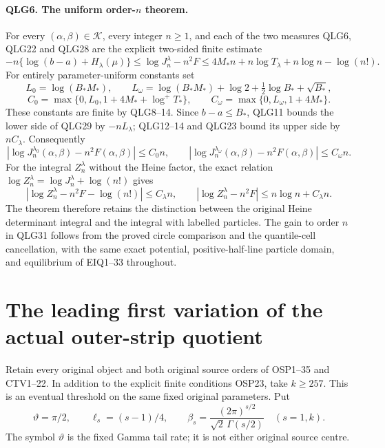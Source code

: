 \documentclass[11pt,a4paper]{article}
\begin{document}
\paragraph{QLG6. The uniform order-\(n\) theorem.}
For every \((\alpha,\beta)\in\mathcal K\), every integer \(n\geq1\),
and each of the two measures QLG6, QLG22 and QLG28 are the explicit
two-sided finite estimate
\[
 \boxed{
 -n\{\log(b-a)+H_\lambda(\mu)\}
 \leq\log J_n^\lambda-n^2F
 \leq 4M_*n+n\log T_\lambda+n\log n-\log(n!).}
 \tag{QLG29}
\]
For entirely parameter-uniform constants set
\[
 L_0=\log(B_*M_*),\qquad
 L_\omega=\log(B_*M_*)+\log2+\tfrac12\log B_*+\sqrt{B_*},
\]
\[
 C_0=\max\{0,L_0,1+4M_*+\log^+T_*\},\qquad
 C_\omega=\max\{0,L_\omega,1+4M_*\}.
 \tag{QLG30}
\]
These constants are finite by QLG8--14. Since \(b-a\leq B_*\),
QLG11 bounds the lower side of QLG29 by \(-nL_\lambda\); QLG12--14
and QLG23 bound its upper side by \(nC_\lambda\). Consequently
\[
 \boxed{\left|\log J_n^{\lambda_0}(\alpha,\beta)
                 -n^2F(\alpha,\beta)\right|\leq C_0n,
 \qquad
 \left|\log J_n^{\lambda_\omega}(\alpha,\beta)
                 -n^2F(\alpha,\beta)\right|\leq C_\omega n.}
 \tag{QLG31}
\]
For the integral \(Z_n^\lambda\) without the Heine factor, the exact
relation \(\log Z_n^\lambda=\log J_n^\lambda+\log(n!)\) gives
\[
 \left|\log Z_n^\lambda-n^2F-\log(n!)\right|\leq C_\lambda n,
 \qquad
 \left|\log Z_n^\lambda-n^2F\right|
                         \leq n\log n+C_\lambda n.
 \tag{QLG32}
\]
The theorem therefore retains the distinction between the original
Heine determinant integral and the integral with labelled particles.
The gain to order \(n\) in QLG31 follows from the proved circle
comparison and the quantile-cell cancellation, with the same exact
potential, positive-half-line particle domain, and equilibrium of
EIQ1--33 throughout.


\clearpage
\section{The leading first variation of the actual outer-strip quotient}
\label{sec:OFV}

Retain every original object and both original source orders of
OSP1--35 and CTV1--22. In addition to the explicit finite conditions
OSP23, take $k\ge257$. This is an eventual threshold on the same
fixed original parameters. Put
\[
\vartheta=\pi/2,\qquad
\ell_s=(s-1)/4,\qquad
\beta_s=\frac{(2\pi)^{s/2}}{\sqrt2\,\Gamma(s/2)}
\quad(s=1,k).
\tag{OFV1}
\]
The symbol $\vartheta$ is the fixed Gamma tail rate; it is not either
original source centre.
\end{document}
